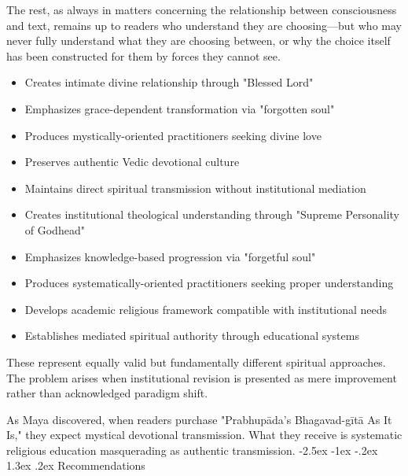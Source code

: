 \documentclass[12pt,twoside]{book}
\makeatletter
\renewcommand\section{\@startsection{section}{1}{\z@}%
{-2.5ex \@plus -1ex \@minus -.2ex}%
{1.3ex \@plus.2ex}%
{\normalfont\Large\bfseries}}
\makeatother
\begin{document}
The rest, as always in matters concerning the relationship between consciousness and text, remains up to readers who understand they are choosing—but who may never fully understand what they are choosing between, or why the choice itself has been constructed for them by forces they cannot see.

\begin{itemize}
\item Creates intimate divine relationship through "Blessed Lord"
\item Emphasizes grace-dependent transformation via "forgotten soul"
\item Produces mystically-oriented practitioners seeking divine love
\item Preserves authentic Vedic devotional culture
\item Maintains direct spiritual transmission without institutional mediation

\item Creates institutional theological understanding through "Supreme Personality of Godhead"
\item Emphasizes knowledge-based progression via "forgetful soul"
\item Produces systematically-oriented practitioners seeking proper understanding
\item Develops academic religious framework compatible with institutional needs
\item Establishes mediated spiritual authority through educational systems
\end{itemize}

These represent equally valid but fundamentally different spiritual approaches. The problem arises when institutional revision is presented as mere improvement rather than acknowledged paradigm shift.

As Maya discovered, when readers purchase "Prabhupāda's Bhagavad-gītā As It Is," they expect mystical devotional transmission. What they receive is systematic religious education masquerading as authentic transmission.
\section{Recommendations}
\label{sec:orgdcf355d}
\end{document}
